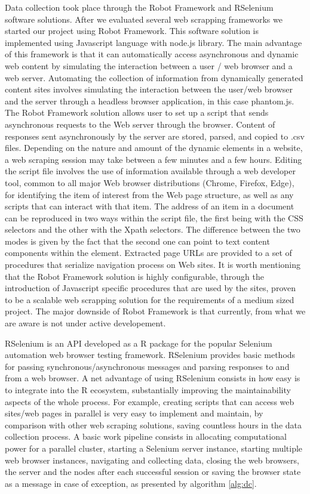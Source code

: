 \documentclass[]{article}
\begin{document}
Data collection took place through the Robot Framework and RSelenium software solutions. 
After we evaluated several web scrapping frameworks we started our project using Robot Framework. This software solution is implemented using Javascript language with node.js library.
The main advantage of this framework is that it can automatically access asynchronous and dynamic web content by simulating the interaction between a user / web browser and a web server. Automating the collection of information from dynamically generated content sites involves simulating the interaction between the user/web browser and the server through a headless browser application, in this case phantom.js. The Robot Framework solution allows user to set up a script that sends asynchronous requests to the Web server through the browser. Content of responses sent asynchronously by the server are stored, parsed, and copied to .csv files. Depending on the nature and amount of the dynamic elements in a website, a web scraping session may take between a few minutes and a few hours.
Editing the script file involves the use of information available through a web developer tool, common to all major Web browser distributions (Chrome, Firefox, Edge), for identifying the item of interest from the Web page structure, as well as any scripts that can interact with that item. The address of an item in a document can be reproduced in two ways within the script file, the first being with the CSS selectors and the other with the Xpath selectors. The difference between the two modes is given by the fact that the second one can point to text content components within the element. Extracted page URLs are provided to a set of procedures that serialize navigation process on Web sites. It is worth mentioning that the Robot Framework solution is highly configurable, through the introduction of Javascript specific procedures that are used by the sites, proven to be a scalable web scrapping solution for the requirements of a medium sized project. The major downside of Robot Framework is that currently, from what we are aware is not under active developement.

RSelenium \cite{rs1} is an API developed as a R package for the popular Selenium automation web browser testing framework. RSelenium provides basic methods for passing synchronous/asynchronous messages and parsing responses to and from a web browser. A net advantage of using RSelenium consists in how easy is to integrate into the R ecosystem, substantially improving the maintainability aspects of the whole process. For example, creating scripts that can access web sites/web pages in parallel \cite{dopar}\cite{foreach} is very easy to implement and maintain, by comparison with other web scraping solutions, saving countless hours in the data collection process. A basic work pipeline consists in allocating computational power for a parallel cluster, starting a Selenium server instance, starting multiple web browser instances, navigating and collecting data, closing the web browsers, the server and the nodes after each successful session or saving the browser state as a message in case of exception, as presented by algorithm \ref{alg:dc}.   
\end{document}
